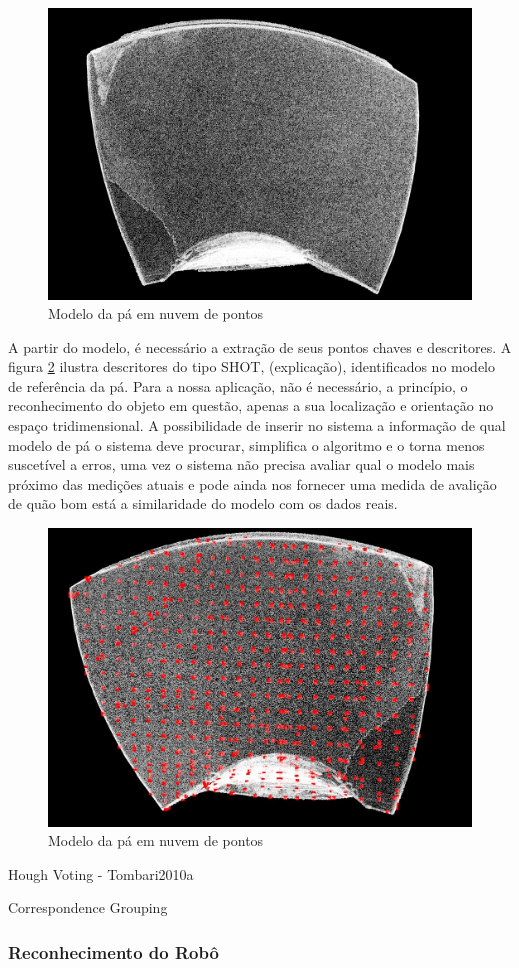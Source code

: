 \begin{figure}[h!]
   \centering
   \includegraphics[width=0.95\columnwidth]{figs/localizacao/pa_pcd}
   \caption{Modelo da pá em nuvem de pontos}
   \label{fig::pa_pcd}
\end{figure}

A partir do modelo, é necessário a extração de seus pontos chaves e descritores.
A figura \ref{fig::pa_key} ilustra descritores do tipo SHOT, (explicação),
identificados no modelo de referência da pá. Para a nossa aplicação, não é
necessário, a princípio, o reconhecimento do objeto em questão, apenas a sua
localização e orientação no espaço tridimensional. A possibilidade de inserir no
sistema a informação de qual modelo de pá o sistema deve procurar, simplifica o
algoritmo e o torna menos suscetível a erros, uma vez o sistema não precisa
avaliar qual o modelo mais próximo das medições atuais e pode ainda nos
fornecer uma medida de avalição de quão bom está a similaridade do modelo com
os dados reais.

\begin{figure}[h!]
   \centering
   \includegraphics[width=0.95\columnwidth]{figs/localizacao/pa_key}
   \caption{Modelo da pá em nuvem de pontos}
   \label{fig::pa_key}
\end{figure}


Hough Voting - Tombari2010a
			  
			  
Correspondence Grouping




\subsubsection{Reconhecimento do Robô}